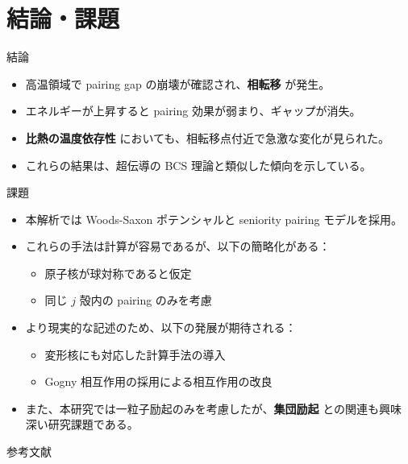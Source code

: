 \documentclass[aspectratio=169, 12pt, dvipdfmx]{beamer}
\begin{document}
\section{結論・課題}

\begin{frame}{結論}
  \begin{itemize}
    \item 高温領域で pairing gap の崩壊が確認され、\textbf{相転移} が発生。
    \item エネルギーが上昇すると pairing 効果が弱まり、ギャップが消失。
    \item \textbf{比熱の温度依存性} においても、相転移点付近で急激な変化が見られた。
    \item これらの結果は、超伝導の BCS 理論と類似した傾向を示している。
  \end{itemize}
\end{frame}


\begin{frame}{課題}
  \begin{itemize}
    \item 本解析では Woods-Saxon ポテンシャルと seniority pairing モデルを採用。
    \item これらの手法は計算が容易であるが、以下の簡略化がある：
      \begin{itemize}
        \item 原子核が球対称であると仮定
        \item 同じ \( j \) 殻内の pairing のみを考慮
      \end{itemize}
    \item より現実的な記述のため、以下の発展が期待される：
      \begin{itemize}
        \item 変形核にも対応した計算手法の導入
        \item Gogny 相互作用の採用による相互作用の改良
      \end{itemize}
    \item また、本研究では一粒子励起のみを考慮したが、\textbf{集団励起} との関連も興味深い研究課題である。
  \end{itemize}
\end{frame}


\begin{frame}{参考文献}
  \scriptsize
	\beamertemplatetextbibitems
	
  
\end{frame}

\texorpdfstring{\appendix}{Appendix}
\end{document}

